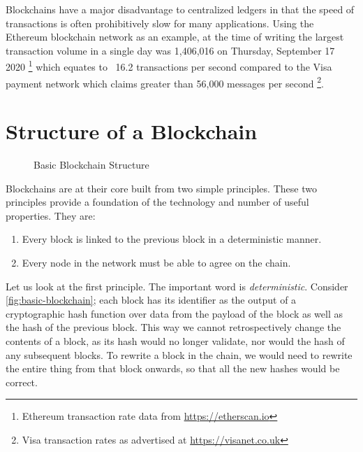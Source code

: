 Blockchains have a major disadvantage to centralized ledgers in that the speed of transactions is often prohibitively slow for many applications. Using the Ethereum blockchain network as an example, at the time of writing the largest transaction volume in a single day was 1,406,016 on Thursday, September 17 2020 \footnote{Ethereum transaction rate data from \url{https://etherscan.io}} which equates to ~16.2 transactions per second compared to the Visa payment network which claims greater than 56,000 messages per second \footnote{Visa transaction rates as advertised at \url{https://visanet.co.uk}}.


\section{Structure of a Blockchain}
\label{ch:blockchain:structure}

\begin{figure}[h]
    \centering
    
    \caption{Basic Blockchain Structure}
    \label{fig:basic-blockchain}
\end{figure}


Blockchains are at their core built from two simple principles. These two principles provide a foundation of the technology and number of useful properties. They are:

\begin{enumerate}
    \item Every block is linked to the previous block in a deterministic manner.
    \item Every node in the network must be able to agree on the chain.
\end{enumerate}

Let us look at the first principle. The important word is \emph{deterministic}. Consider \autoref{fig:basic-blockchain}; each block has its identifier as the output of a cryptographic hash function over data from the payload of the block as well as the hash of the previous block. This way we cannot retrospectively change the contents of a block, as its hash would no longer validate, nor would the hash of any subsequent blocks. To rewrite a block in the chain, we would need to rewrite the entire thing from that block onwards, so that all the new hashes would be correct.

